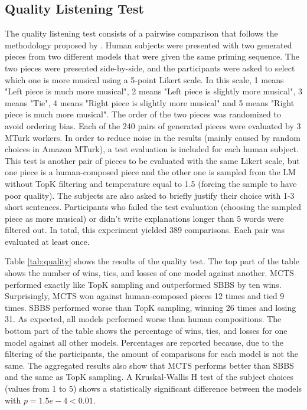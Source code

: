 
\subsection{Quality Listening Test}

The quality listening test consists of a pairwise comparison that follows the methodology proposed by \citet{huang2018music}. Human subjects were presented with two generated pieces from two different models that were given the same priming sequence. The two pieces were presented side-by-side, and the participants were asked to select which one is more musical using a 5-point Likert scale. In this scale, 1 means "Left piece is much more musical", 2 means "Left piece is slightly more musical", 3 means "Tie", 4 means "Right piece is slightly more musical" and 5 means "Right piece is much more musical". The order of the two pieces was randomized to avoid ordering bias. Each of the 240 pairs of generated pieces were evaluated by 3 MTurk workers. In order to reduce noise in the results (mainly caused by random choices in Amazon MTurk), a test evaluation is included for each human subject. This test is another pair of pieces to be evaluated with the same Likert scale, but one piece is a human-composed piece and the other one is sampled from the LM without TopK filtering and temperature equal to 1.5 (forcing the sample to have poor quality). The subjects are also asked to briefly justify their choice with 1-3 short sentences. Participants who failed the test evaluation (choosing the sampled piece as more musical) or didn't write explanations longer than 5 words were filtered out. In total, this experiment yielded 389 comparisons. Each pair was evaluated at least once.

Table \ref{tab:quality} shows the results of the quality test. The top part of the table shows the number of wins, ties, and losses of one model against another.  MCTS performed exactly like TopK sampling and outperformed SBBS by ten wins. Surprisingly, MCTS won against human-composed pieces 12 times and tied 9 times. SBBS performed worse than TopK sampling, winning 26 times and losing 31. As expected, all models performed worse than human compositions. The bottom part of the table shows the percentage of wins, ties, and losses for one model against all other models. Percentages are reported because, due to the filtering of the participants, the amount of comparisons for each model is not the same. The aggregated results also show that MCTS performs better than SBBS and the same as TopK sampling. A Kruskal-Wallis H test of the subject choices (values from 1 to 5) shows a statistically significant difference between the models with $p = 1.5e-4 < 0.01$.

